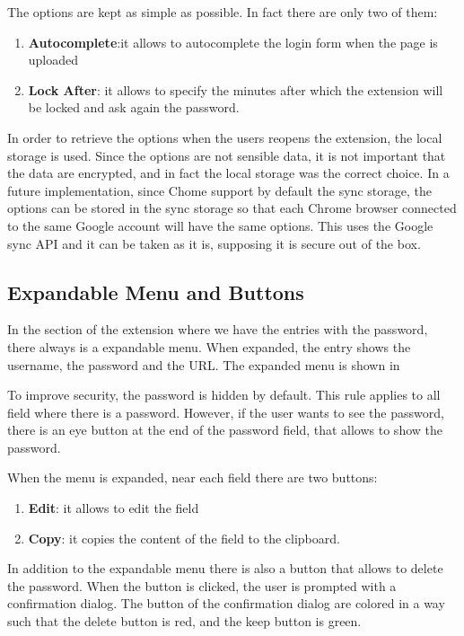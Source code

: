 The options are kept as simple as possible. In fact there are only two of them:

\begin{enumerate}
    \item \textbf{Autocomplete}:it allows to autocomplete the login form when the page is uploaded
    \item \textbf{Lock After}: it allows to specify the minutes after which the extension will be locked and ask again the password.
\end{enumerate}

In order to retrieve the options when the users reopens the extension, the local storage is used. Since the options are not sensible data, it is not important that the data are encrypted, and in fact the local storage was the correct choice. In a future implementation, since Chome support by default the sync storage, the options can be stored in the sync storage so that each Chrome browser connected to the same Google account will have the same options. This uses the Google sync API and it can be taken as it is, supposing it is secure out of the box. 


\subsection{Expandable Menu and Buttons}

In the section of the extension where we have the entries with the password, there always is a expandable menu. When expanded, the entry shows the username, the password and the URL. The expanded menu is shown in %

To improve security, the password is hidden by default. This rule applies to all field where there is a password. However, if the user wants to see the password, there is an eye button at the end of the password field, that allows to show the password.

When the menu is expanded, near each field there are two buttons:

\begin{enumerate}
    \item \textbf{Edit}: it allows to edit the field
    \item \textbf{Copy}: it copies the content of the field to the clipboard.
\end{enumerate}

In addition to the expandable menu there is also a button that allows to delete the password. When the button is clicked, the user is prompted with a confirmation dialog. The button of the confirmation dialog are colored in a way such that the delete button is red, and the keep button is green.


